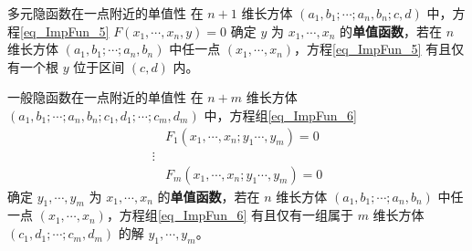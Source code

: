 \begin{definition}{多元隐函数在一点附近的单值性}
在 $n+1$ 维长方体 $(a_1,b_1;\cdots;a_n,b_n;c,d)$ 中，方程\autoref{eq_ImpFun_5} $F(x_1,\cdots,x_n,y)=0$ 确定 $y$ 为 $x_1,\cdots,x_n$ 的\textbf{单值函数}，若在 $n$ 维长方体 $(a_1,b_1;\cdots;a_n,b_n)$ 中任一点 $(x_1,\cdots,x_n)$，方程\autoref{eq_ImpFun_5} 有且仅有一个根 $y$ 位于区间 $(c,d)$ 内。
\end{definition}

\begin{definition}{一般隐函数在一点附近的单值性}
在 $n+m$ 维长方体 $(a_1,b_1;\cdots;a_n,b_n;c_1,d_1;\cdots;c_m,d_m)$ 中，方程组\autoref{eq_ImpFun_6} 
\begin{equation}
\begin{aligned}
&F_1(x_1,\cdots,x_n;y_1\cdots,y_m)=0\\
\vdots\\
&F_m(x_1,\cdots,x_n;y_1\cdots,y_m)=0
\end{aligned}
\end{equation}
确定 $y_1,\cdots,y_m$ 为 $x_1,\cdots,x_n$ 的\textbf{单值函数}，若在 $n$ 维长方体 $(a_1,b_1;\cdots;a_n,b_n)$ 中任一点 $(x_1,\cdots,x_n)$，方程组\autoref{eq_ImpFun_6} 有且仅有一组属于 $m$ 维长方体 $(c_1,d_1;\cdots;c_m,d_m)$ 的解 $y_1,\cdots,y_m$。
\end{definition}